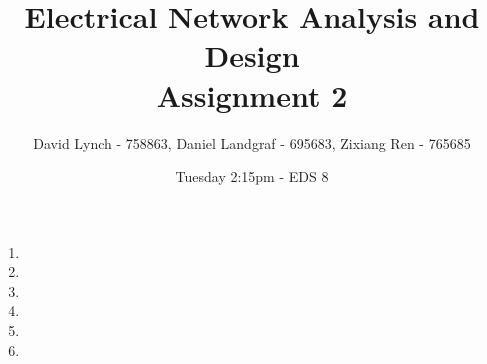 \documentclass[10pt,a4paper]{article}
\author{David Lynch - 758863, Daniel Landgraf - 695683, Zixiang Ren - 765685}
\title{\huge{Electrical Network Analysis and Design} \\ Assignment 2}
\date{\small{Tuesday 2:15pm - EDS 8}}
\begin{document}
\maketitle

	\begin{enumerate}
		\item{
		\let\clearpage\relax
		
		}
		\item{
		\let\clearpage\relax
		
		}
		\item{
		\let\clearpage\relax
		
		}
		\item{
		\let\clearpage\relax
		
		}
		\item{
		\let\clearpage\relax
		
		}
		
		\newpage	%
		\item{
		\let\clearpage\relax
		
		}
	\end{enumerate}
\end{document}
